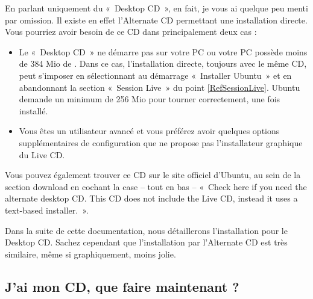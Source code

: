 \begin{nota}
En parlant uniquement du «~Desktop CD~», en fait, je vous ai quelque peu menti par omission. Il existe en effet l'Alternate CD permettant une installation directe. Vous pourriez avoir besoin de ce CD dans principalement deux cas :\par
\begin{itemize}
\item Le «~Desktop CD~» ne démarre pas sur votre PC ou votre PC possède moins de 384 Mio de . Dans ce cas, l'installation directe, toujours avec le même CD, peut s'imposer en sélectionnant au démarrage «~Installer Ubuntu~» et en abandonnant la section «~Session Live~» du point \ref{RefSessionLive}. Ubuntu demande un minimum de 256 Mio pour tourner correctement, une fois installé.
\item Vous êtes un utilisateur avancé et vous préférez avoir quelques options supplémentaires de configuration que ne propose pas l'installateur graphique du Live CD.
\end{itemize}
\end{nota}
Vous pouvez également trouver ce CD sur le site officiel d'Ubuntu, au sein de la section download en cochant la case -- tout en bas -- «~Check here if you need the alternate desktop CD. This CD does not include the Live CD, instead it uses a text-based installer.~».\par
Dans la suite de cette documentation, nous détaillerons l'installation pour le Desktop CD. Sachez cependant que l'installation par l'Alternate CD est très similaire, même si graphiquement, moins jolie.
\subsection{J'ai mon CD, que faire maintenant ?}
